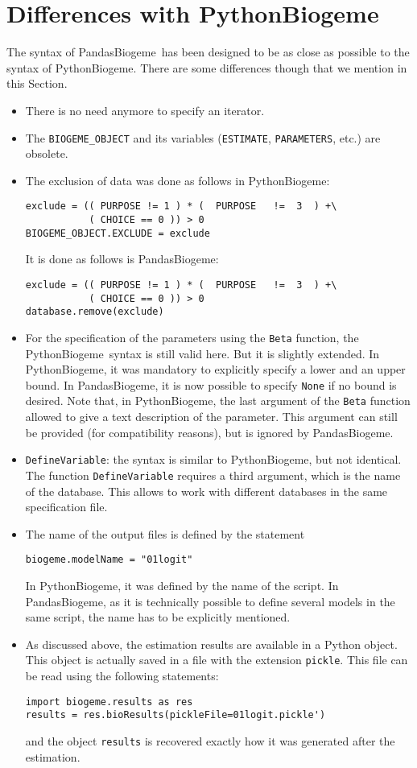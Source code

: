 \documentclass[12pt,a4paper]{article}
\newcommand{\PBIOGEME}{PythonBiogeme}
\newcommand{\PDBIOGEME}{PandasBiogeme}
\begin{document}
\section{Differences with \PBIOGEME}
The syntax of \PDBIOGEME\ has been designed to be as close as possible
to the syntax of \PBIOGEME. There are some differences though that we
mention in this Section.

\begin{itemize}
\item There is no need anymore to specify an iterator.
\item The \lstinline+BIOGEME_OBJECT+ and its variables
  (\lstinline+ESTIMATE+, \lstinline+PARAMETERS+, etc.) are obsolete.
\item The exclusion of data was done as follows in \PBIOGEME:
\begin{lstlisting}[style=nonumbers]
exclude = (( PURPOSE != 1 ) * (  PURPOSE   !=  3  ) +\
           ( CHOICE == 0 )) > 0
BIOGEME_OBJECT.EXCLUDE = exclude
\end{lstlisting}
It is done as follows is \PDBIOGEME:
\begin{lstlisting}[style=nonumbers]
exclude = (( PURPOSE != 1 ) * (  PURPOSE   !=  3  ) +\
           ( CHOICE == 0 )) > 0
database.remove(exclude)
\end{lstlisting}

\item For the specification of the parameters using the
  \lstinline+Beta+ function, the \PBIOGEME\ syntax is still valid here. But it is
slightly extended. In \PBIOGEME, it was mandatory to explicitly specify  a
lower and an upper bound. In \PDBIOGEME, it is now possible to specify
\lstinline+None+ if no bound is desired.  Note that, in \PBIOGEME, the
last argument of the \lstinline+Beta+ function allowed to give a text
description of the parameter. This argument can still be provided (for
compatibility reasons), but is ignored by \PDBIOGEME.
\item \lstinline+DefineVariable+: the syntax is similar to \PBIOGEME, but not identical. The function
\lstinline+DefineVariable+ requires a third argument, which is the
name of the database. This allows to work with different databases in
the same specification file.
\item The name of the output files is defined by the statement
\begin{lstlisting}[style=nonumbers]
biogeme.modelName = "01logit"
\end{lstlisting}
In \PBIOGEME, it was defined by the name of the script. In \PDBIOGEME,
as it is technically possible to define several models in the same
script, the name has to be explicitly mentioned.
\item As discussed above, the estimation results are available in a
  Python object. This object is actually saved in a file with the
  extension \lstinline+pickle+. This file can be read using the
  following statements:
\begin{lstlisting}[style=nonumbers]
import biogeme.results as res
results = res.bioResults(pickleFile=01logit.pickle')
\end{lstlisting}
and the object \lstinline+results+ is recovered exactly how it was
generated after the estimation. 
\end{itemize}
\end{document}

